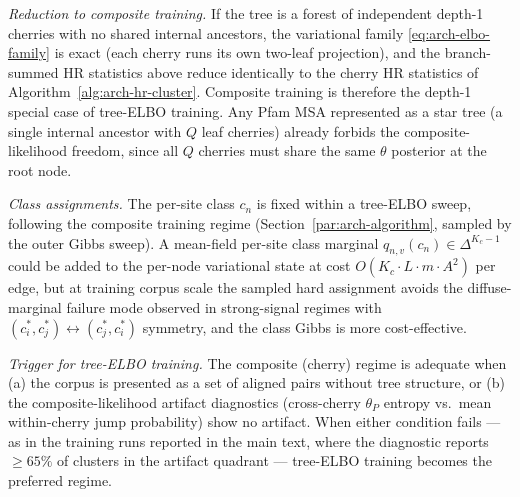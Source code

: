 \emph{Reduction to composite training.} If the tree is a forest of
independent depth-1 cherries with no shared internal ancestors, the
variational family \eqref{eq:arch-elbo-family} is exact (each cherry
runs its own two-leaf projection), and the branch-summed HR statistics
above reduce identically to the cherry HR statistics of
Algorithm~\ref{alg:arch-hr-cluster}. Composite training is therefore
the depth-1 special case of tree-ELBO training. Any Pfam MSA
represented as a star tree (a single internal ancestor with $Q$ leaf
cherries) already forbids the composite-likelihood freedom, since all
$Q$ cherries must share the same $\theta$ posterior at the root
node.

\emph{Class assignments.} The per-site class $c_n$ is fixed within a
tree-ELBO sweep, following the composite training regime
(Section~\ref{par:arch-algorithm}, sampled by the outer Gibbs sweep).
A mean-field per-site class marginal
$q_{n, v}(c_n) \in \Delta^{K_c - 1}$ could be added to the per-node
variational state at cost $O(K_c \cdot L \cdot m \cdot A^2)$
per edge, but at training corpus scale the sampled hard assignment
avoids the diffuse-marginal failure mode observed in strong-signal
regimes with $(c_i^*, c_j^*) \leftrightarrow (c_j^*, c_i^*)$
symmetry, and the class Gibbs is more cost-effective.

\emph{Trigger for tree-ELBO training.} The composite (cherry) regime
is adequate when (a) the corpus is presented as a set of aligned pairs
without tree structure, or (b) the composite-likelihood artifact
diagnostics (cross-cherry $\theta_P$ entropy vs.\ mean within-cherry
jump probability) show no artifact. When either condition fails --- as
in the training runs reported in the main text, where the
diagnostic reports $\geq 65\%$ of clusters in the artifact quadrant ---
tree-ELBO training becomes the preferred regime.

